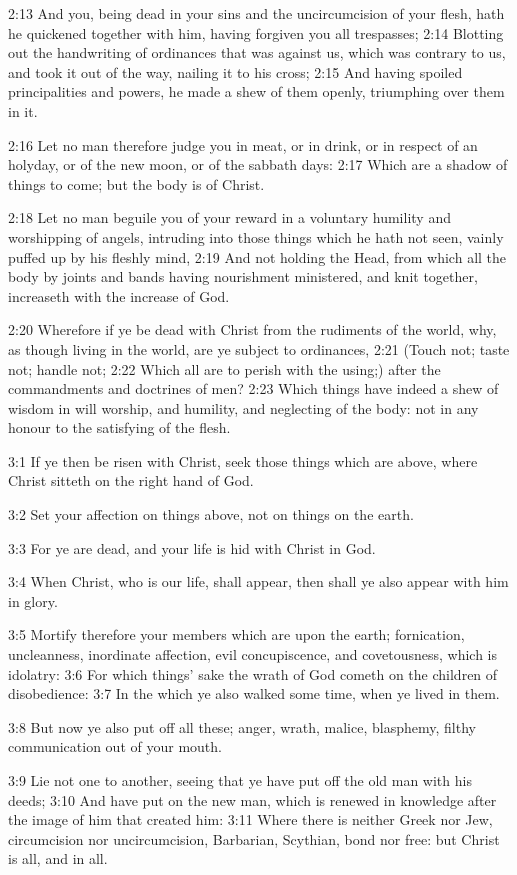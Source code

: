 2:13  And you, being dead in your sins and the uncircumcision of your
flesh, hath he quickened together with him, having forgiven you all
trespasses;
2:14  Blotting out the handwriting of ordinances that was against us, which
was contrary to us, and took it out of the way, nailing it to his cross;
2:15  And having spoiled principalities and powers, he made a shew of them
openly, triumphing over them in it.

2:16  Let no man therefore judge you in meat, or in drink, or in respect of
an holyday, or of the new moon, or of the sabbath days:
2:17  Which are a shadow of things to come; but the body is of Christ.

2:18  Let no man beguile you of your reward in a voluntary humility and
worshipping of angels, intruding into those things which he hath not seen,
vainly puffed up by his fleshly mind,
2:19  And not holding the Head, from which all the body by joints and bands
having nourishment ministered, and knit together, increaseth with the
increase of God.

2:20  Wherefore if ye be dead with Christ from the rudiments of the world,
why, as though living in the world, are ye subject to ordinances,
2:21  (Touch not; taste not; handle not;
2:22  Which all are to perish with the using;) after the commandments and
doctrines of men?
2:23  Which things have indeed a shew of wisdom in will worship, and
humility, and neglecting of the body: not in any honour to the satisfying
of the flesh.

3:1  If ye then be risen with Christ, seek those things which are above,
where Christ sitteth on the right hand of God.

3:2  Set your affection on things above, not on things on the earth.

3:3  For ye are dead, and your life is hid with Christ in God.

3:4  When Christ, who is our life, shall appear, then shall ye also appear
with him in glory.

3:5  Mortify therefore your members which are upon the earth; fornication,
uncleanness, inordinate affection, evil concupiscence, and covetousness,
which is idolatry:
3:6  For which things' sake the wrath of God cometh on the children of
disobedience:
3:7  In the which ye also walked some time, when ye lived in them.

3:8  But now ye also put off all these; anger, wrath, malice, blasphemy,
filthy communication out of your mouth.

3:9  Lie not one to another, seeing that ye have put off the old man with
his deeds;
3:10  And have put on the new man, which is renewed in knowledge after the
image of him that created him:
3:11  Where there is neither Greek nor Jew, circumcision nor
uncircumcision, Barbarian, Scythian, bond nor free: but Christ is all, and in
all.

